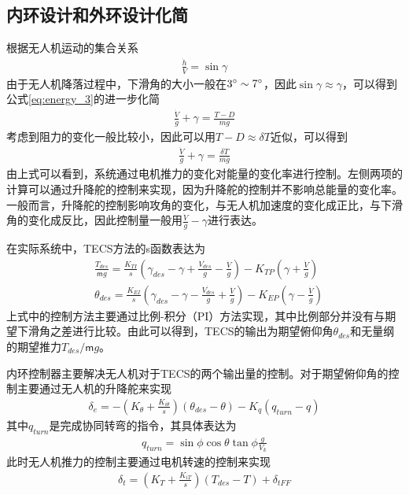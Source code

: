 \subsection{内环设计和外环设计化简}
根据无人机运动的集合关系
\begin{align}
\frac{\dot{h}}{V} = \sin \gamma
\end{align}
由于无人机降落过程中，下滑角的大小一般在$3\degree \sim 7\degree$，因此$\sin \gamma \approx \gamma$，可以得到公式\ref{eq:energy_3}的进一步化简
\begin{align}
\frac{\dot{V}}{g} + \gamma =\frac{T-D}{mg}
\end{align}
考虑到阻力的变化一般比较小，因此可以用$T-D\approx \delta T$近似，可以得到
\begin{align}
\frac{\dot{V}}{g} + \gamma = \frac{\delta T}{mg}
\end{align}
由上式可以看到，系统通过电机推力的变化对能量的变化率进行控制。左侧两项的计算可以通过升降舵的控制来实现，因为升降舵的控制并不影响总能量的变化率。一般而言，升降舵的控制影响攻角的变化，与无人机加速度的变化成正比，与下滑角的变化成反比，因此控制量一般用$\frac{\dot{V}}{g} - \gamma $进行表达。

在实际系统中，TECS方法的s函数表达为
\begin{align}
&\frac{T_{des}}{\mathsf{m}g} = \frac{K_{TI}}{s} (\gamma_{des} - \gamma + \frac{\dot{V_{des}}}{g} - \frac{\dot{V}}{g}) - K_{TP}(\gamma + \frac{ \dot{V}}{g}) \\
&\theta_{des} = \frac{K_{EI}}{s} (\gamma_{des} - \gamma - \frac{\dot{V_{des}}}{g} + \frac{\dot{V}}{g}) - K_{EP}(\gamma - \frac{ \dot{V}}{g})
\end{align}
上式中的控制方法主要通过比例-积分（PI）方法实现，其中比例部分并没有与期望下滑角之差进行比较。由此可以得到，TECS的输出为期望俯仰角$\theta_{des}$和无量纲的期望推力$T_{des}/\mathsf{m}g$。

内环控制器主要解决无人机对于TECS的两个输出量的控制。对于期望俯仰角的控制主要通过无人机的升降舵来实现
\begin{align}
\delta_e = -(K_\theta+\frac{K_{i\theta}}{s})(\theta_{des}-\theta)-K_q(q_{turn}-q)
\end{align}
其中$q_{turn}$是完成协同转弯的指令，其具体表达为
\begin{align}
q_{turn} = \sin\phi \cos\theta\tan \phi \frac{g}{V_k}
\end{align}
此时无人机推力的控制主要通过电机转速的控制来实现
\begin{align}
\delta_t = (K_T + \frac{K_{iT}}{s})(T_{des} - T) + \delta_{tFF}
\end{align}

